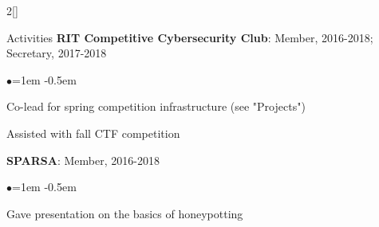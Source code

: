 \documentclass[8pt]{resume} %
\begin{document}
\begin{multicols}{2}[]
\begin{rSection}{Activities}
    {\bf RIT Competitive Cybersecurity Club}: Member, 2016-2018; Secretary,
    2017-2018
    \begin{list}{$\bullet$}{\leftmargin=1em}
    \itemsep -0.5em \vspace{-0.5em}
    \item Co-lead for spring competition infrastructure (see "Projects")
    \item Assisted with fall CTF competition
    \end{list}


    {\bf SPARSA}: Member, 2016-2018
    \begin{list}{$\bullet$}{\leftmargin=1em}
    \itemsep -0.5em \vspace{-0.5em}
    \item Gave presentation on the basics of honeypotting
    \end{list}



\end{rSection}


\end{multicols}

\end{document}
